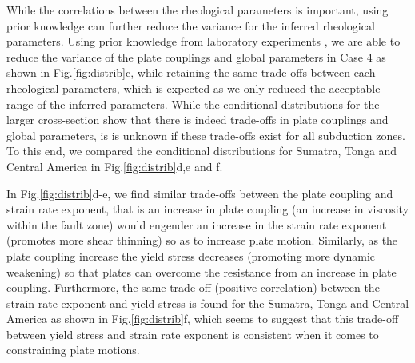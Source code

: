 \documentclass[12pt]{article}
\begin{document}
While the correlations between the rheological parameters is important, using prior knowledge can further reduce the variance for the inferred rheological parameters. Using prior knowledge from laboratory experiments \citep{korenaga2008new}, we are able to reduce the variance of the plate couplings and global parameters in Case 4 as shown in Fig.\ref{fig:distrib}c, while retaining the same trade-offs between each rheological parameters, which is expected as we only reduced the acceptable range of the inferred parameters. While the conditional distributions for the larger cross-section show that there is indeed trade-offs in plate couplings and global parameters, is is unknown if these trade-offs exist for all subduction zones. To this end, we compared the conditional distributions for Sumatra, Tonga and Central America in Fig.\ref{fig:distrib}d,e and f. 

In Fig.\ref{fig:distrib}d-e, we find similar trade-offs between the plate coupling and strain rate exponent, that is an increase in plate coupling (an increase in viscosity within the fault zone) would engender an increase in the strain rate exponent (promotes more shear thinning) so as to increase plate motion. Similarly, as the plate coupling increase the yield stress decreases (promoting more dynamic weakening) so that plates can overcome the resistance from an increase in plate coupling. Furthermore, the same trade-off (positive correlation) between the strain rate exponent and yield stress is found for the Sumatra, Tonga and Central America as shown in Fig.\ref{fig:distrib}f, which seems to suggest that this trade-off between yield stress and strain rate exponent is consistent when it comes to constraining plate motions. 
\end{document}
